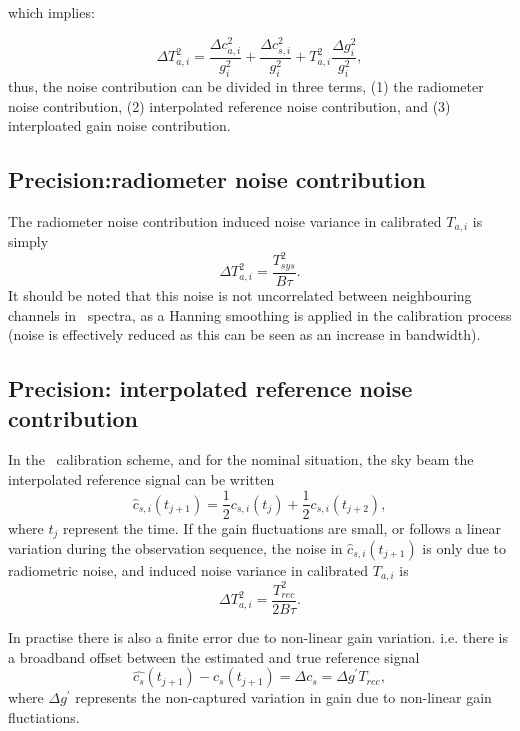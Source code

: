 which implies:

\begin{equation}
\Delta T_{a,i}^{2} = \frac{\Delta c_{a,i}^{2}}{g_{i}^2} + \frac{\Delta c_{s,i}^{2}}{g_{i}^2} + T_{a,i}^{2}\frac{\Delta g_{i}^{2}}{g_{i}^2},
\end{equation}
thus, the noise contribution can be divided in three terms, (1) the radiometer noise contribution,
(2) interpolated reference noise contribution, and (3) interploated gain noise contribution.  

\subsection*{Precision:radiometer noise contribution}
The radiometer noise contribution induced noise variance in calibrated \(T_{a,i}\) is simply
\begin{equation}
\Delta T_{a,i}^2 = \frac{T_{sys}^{2}}{B\tau}.
\end{equation}
It should be noted that this noise is not uncorrelated between neighbouring channels
in \smr\ spectra, as a Hanning smoothing is applied in the calibration process
(noise is effectively reduced as this can be seen as an increase in bandwidth).    


\subsection*{Precision: interpolated reference noise contribution}
In the \smr\ calibration scheme, and for the nominal situation, the sky beam the interpolated
reference signal can be written
\begin{equation}
\hat{c}_{s,i}(t_{j+1}) = \frac{1}{2}c_{s,i}(t_{j}) + \frac{1}{2}c_{s,i}(t_{j+2}), 
\end{equation}
where \(t_{j}\) represent the time.  
If the gain fluctuations are small, or follows a linear variation during the
observation sequence, the noise in \(\hat{c}_{s,i}(t_{j+1})\) is only due to radiometric
noise, and induced noise variance in calibrated \(T_{a,i}\) is
\begin{equation}
\Delta T_{a,i}^2 = \frac{T_{rec}^{2}}{2B\tau}.
\end{equation}

In practise there is also a finite error due to non-linear gain variation.
i.e. there is a broadband offset between the estimated and true reference signal 
\begin{equation}
\hat{c_{s}}(t_{j+1}) - c_{s}(t_{j+1}) = \Delta c_{s} = \Delta g^{'} T_{rec},
\end{equation}
where \(\Delta g^{'}\) represents the non-captured variation in gain
due to non-linear gain fluctiations. 


